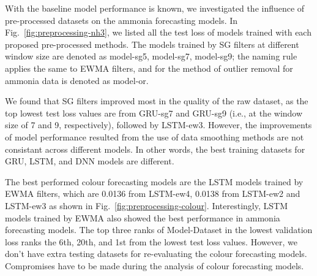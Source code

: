 With the baseline model performance is known, we investigated the influence of pre-processed datasets on the ammonia forecasting models. In Fig.~\ref{fig:preprocessing-nh3}, we listed all the test loss of models trained with each proposed pre-processed methods. The models trained by SG filters at different window size are denoted as model-sg5, model-sg7, model-sg9; the naming rule applies the same to EWMA filters, and for the method of outlier removal for ammonia data is denoted as model-or.

We found that SG filters improved most in the quality of the raw dataset, as the top lowest test loss values are from GRU-sg7 and GRU-sg9 (i.e., at the window size of 7 and 9, respectively), followed by LSTM-ew3. However, the improvements of model performance resulted from the use of data smoothing methods are not consistant across different models. In other words, the best training datasets for GRU, LSTM, and DNN models are different.

The best performed colour forecasting models are the LSTM models trained by EWMA filters, which are 0.0136 from LSTM-ew4, 0.0138 from LSTM-ew2 and LSTM-ew3 as shown in Fig.~\ref{fig:preprocessing-colour}. Interestingly, LSTM models trained by EWMA also showed the best performance in ammonia forecasting models. The top three ranks of Model-Dataset in the lowest validation loss ranks the 6th, 20th, and 1st from the lowest test loss values. However, we don't have extra testing datasets for re-evaluating the colour forecasting models. Compromises have to be made during the analysis of colour forecasting models.

